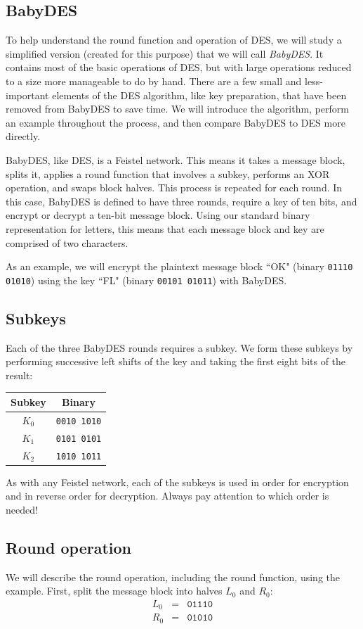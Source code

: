 \documentclass{book}
\theoremstyle{plain}
\theoremstyle{definition}
\newcommand{\ciphertext}[1]{\texttt{#1}} %
\begin{document}
\subsection{BabyDES}
To help understand the round function and operation of DES, we will study a simplified version (created for this purpose) that we will call \textit{BabyDES}. It contains most of the basic operations of DES, but with large operations reduced to a size more manageable to do by hand. There are a few small and less-important elements of the DES algorithm, like key preparation, that have been removed from BabyDES to save time. We will introduce the algorithm, perform an example throughout the process, and then compare BabyDES to DES more directly.

BabyDES, like DES, is a Feistel network. This means it takes a message block, splits it, applies a round function that involves a subkey, performs an XOR operation, and swaps block halves. This process is repeated for each round. In this case, BabyDES is defined to have three rounds, require a key of ten bits, and encrypt or decrypt a ten-bit message block. Using our standard binary representation for letters, this means that each message block and key are comprised of two characters.

As an example, we will encrypt the plaintext message block ``OK" (binary \ciphertext{01110 01010}) using the key ``FL" (binary \ciphertext{00101 01011}) with BabyDES.

\subsection{Subkeys}
Each of the three BabyDES rounds requires a subkey. We form these subkeys by performing successive left shifts of the key and taking the first eight bits of the result:
\begin{center}
\begin{tabular}{cc}
Subkey & Binary \\
\hline
$K_0$ & \ciphertext{0010 1010} \\
$K_1$ & \ciphertext{0101 0101} \\
$K_2$ & \ciphertext{1010 1011}
\end{tabular}
\end{center}
As with any Feistel network, each of the subkeys is used in order for encryption and in reverse order for decryption. Always pay attention to which order is needed!

\subsection{Round operation}
We will describe the round operation, including the round function, using the example. First, split the message block into halves $L_0$ and $R_0$:
\begin{eqnarray*}
L_0 &=& \ciphertext{01110} \\
R_0 &=& \ciphertext{01010}
\end{eqnarray*}
\end{document}
